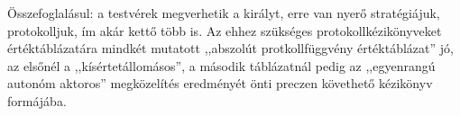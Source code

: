 \documentclass{article}
\newcommand{\blk}{\cellcolor{darkgray}}
\newcommand{\red}{\cellcolor{red!33}}
\newcommand{\grn}{\cellcolor{green!33}}
\newcommand{\just}[1]{\boxed{#1}}%
\newcommand{\incl}{\mathbf{incl}}
\newcommand{\excl}{\mathbf{excl}}
\begin{document}
\begin{comment}
				               &  2                        &    \blk           & \blk           & \red\just\excl & \grn\just\incl & \blk           & \blk           \\\cline{2-8}
				               &  3                        &    \blk           & \blk           & \red\just\excl & \grn\just\incl & \blk           & \blk           \\\hline\hline
			\multirow{4}{*}{3}     &  0                        &    \blk           & \blk           & \blk           & \blk           & \blk           & \blk           \\\cline{2-8}
				               &  1                        &    \blk           & \blk           & \blk           & \blk           & \blk           & \blk           \\\cline{2-8}
				               &  2                        &    \blk           & \blk           & \blk           & \blk           & \blk           & \blk           \\\cline{2-8}
				               &  3                        &    \blk           & \blk           & \blk           & \blk           & \blk           & \blk           \\\hline
		\end{tabular}
	\end{table}

	\end{comment}

	Összefoglalásul: a testvérek megverhetik a királyt, erre van nyerő stratégiájuk, protokolljuk, ím akár kettő több is. Az ehhez szükséges protokollkézikönyveket értéktáblázatára mindkét mutatott ,,abszolút protkollfüggvény értéktáblázat'' jó, az elsőnél a ,,kísértetállomásos'', a második táblázatnál pedig az ,,egyenrangú autonóm aktoros'' megközelítés eredményét önti preczen követhető kézikönyv formájába.
\end{document}
